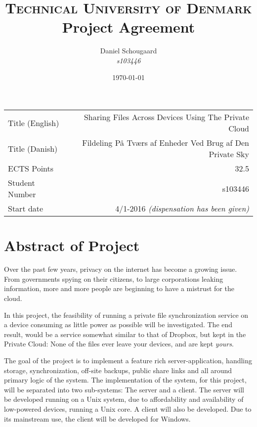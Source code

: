 \documentclass[a4paper,10pt]{article}
\title{	
\textsc{Technical University of Denmark} \\ [25pt] 
\huge Project Agreement
}
\author{Daniel Schougaard \\ \textit{s103446}}
\date{\normalsize\today}
\begin{document}
\maketitle 


\begin{tabular}{ | l | r | }
	Title (English)		&	Sharing Files Across Devices Using The Private Cloud				\\
	Title (Danish)		&	Fildeling På Tværs af Enheder Ved Brug af Den Private Sky			\\
	ECTS Points			&	32.5																\\
	Student Number		&	s103446																\\
	Start date 			&	4/1-2016 \textit{(dispensation has been given)}					\\
\end{tabular}



\section{Abstract of Project}
	Over the past few years, privacy on the internet has become a growing issue. From governments spying on their citizens, to large corporations leaking information, more and more people are beginning to have a mistrust for the cloud.



	In this project, the feasibility of running a private file synchronization service on a device consuming as little power as possible will be investigated. The end result, would be a service somewhat similar to that of Dropbox, but kept in the Private Cloud: None of the files ever leave your devices, and are kept \emph{yours}.



	The goal of the project is to implement a feature rich server-application, handling storage, synchronization, off-site backups, public share links and all around primary logic of the system. The implementation of the system, for this project, will be separated into two sub-systems: The server and a client. The server will be developed running on a Unix system, due to affordability and availability of low-powered devices, running a Unix core. A client will also be developed. Due to its mainstream use, the client will be developed for Windows.
\end{document}
